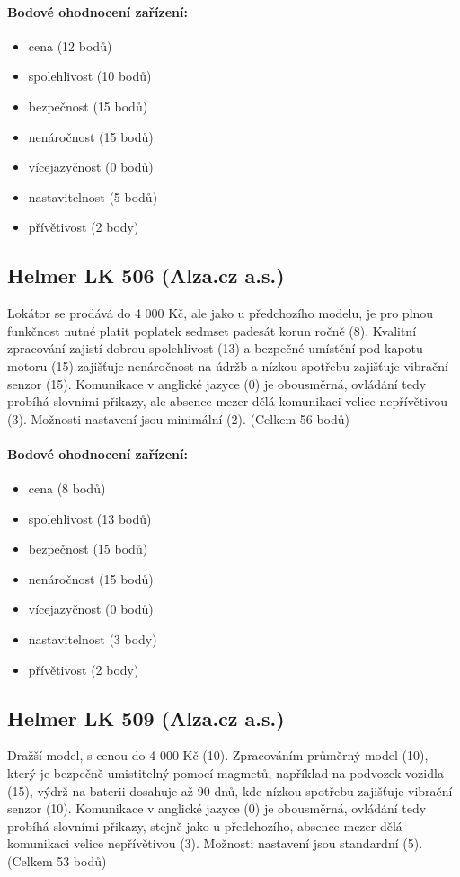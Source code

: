 \documentclass[FM,BP]{tulthesis}  %
\begin{document}
\paragraph{Bodové ohodnocení zařízení:}
\begin{itemize}
\item cena (12 bodů)
\item spolehlivost (10 bodů)
\item bezpečnost (15 bodů)
\item nenáročnost (15 bodů)
\item vícejazyčnost (0 bodů)
\item nastavitelnost (5 bodů)
\item přívětivost (2 body)
\end{itemize}

\subsection{Helmer LK 506 (Alza.cz a.s.)}
Lokátor se prodává do 4 000 Kč, ale jako u předchozího modelu, je pro plnou funkčnost nutné platit poplatek sedmset padesát korun ročně (8). Kvalitní zpracování zajistí dobrou spolehlivost (13) a bezpečné umístění pod kapotu motoru (15) zajišťuje nenáročnost na údržb a nízkou spotřebu zajišťuje vibrační senzor (15). Komunikace v anglické jazyce (0) je obousměrná, ovládání tedy probíhá slovními přikazy, ale absence mezer dělá komunikaci velice nepřívětivou (3). Možnosti nastavení jsou minimální (2). (Celkem 56 bodů)

\paragraph{Bodové ohodnocení zařízení:}
\begin{itemize}
\item cena (8 bodů)
\item spolehlivost (13 bodů)
\item bezpečnost (15 bodů)
\item nenáročnost (15 bodů)
\item vícejazyčnost (0 bodů)
\item nastavitelnost (3 body)
\item přívětivost (2 body)
\end{itemize}

\subsection{Helmer LK 509 (Alza.cz a.s.)}
Dražší model, s cenou do 4 000 Kč (10). Zpracováním průměrný model (10), který je bezpečně umistitelný pomocí magmetů, například na podvozek vozidla (15), výdrž na baterii dosahuje až 90 dnů, kde nízkou spotřebu zajišťuje vibrační senzor (10). Komunikace v anglické jazyce (0) je obousměrná, ovládání tedy probíhá slovními přikazy, stejně jako u předchozího, absence mezer dělá komunikaci velice nepřívětivou (3). Možnosti nastavení jsou standardní (5). (Celkem 53 bodů)
\end{document}
